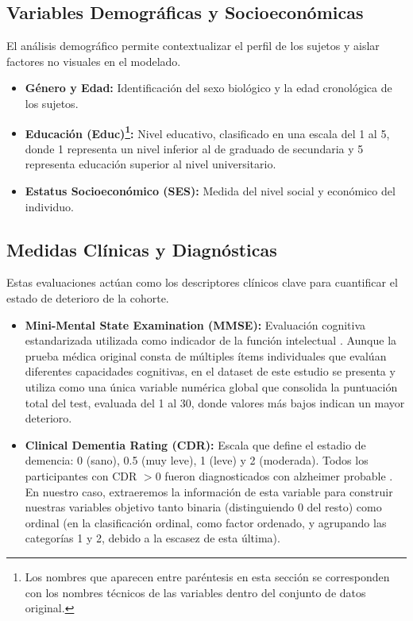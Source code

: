 \documentclass[12pt, oneside, english, spanish]{book}
\begin{document}
\subsection{Variables Demográficas y Socioeconómicas} \label{subsec:variables_demograficas}
El análisis demográfico permite contextualizar el perfil de los sujetos y aislar factores no visuales en el modelado.
\begin{itemize}
	\item \textbf{Género y Edad:} Identificación del sexo biológico y la edad cronológica de los sujetos.
	\item \textbf{Educación (Educ)\footnote{Los nombres que aparecen entre paréntesis en esta sección se corresponden con los nombres técnicos de las variables dentro del conjunto de datos original.}:} Nivel educativo, clasificado en una escala del 1 al 5, donde 1 representa un nivel inferior al de graduado de secundaria y 5 representa educación superior al nivel universitario.
	\item \textbf{Estatus Socioeconómico (SES):} Medida del nivel social y económico del individuo.
\end{itemize}

\subsection{Medidas Clínicas y Diagnósticas} \label{subsec:medidas_clinicas}
Estas evaluaciones actúan como los descriptores clínicos clave para cuantificar el estado de deterioro de la cohorte.
\begin{itemize}
	\item \textbf{Mini-Mental State Examination (MMSE):} Evaluación cognitiva estandarizada utilizada como indicador de la función intelectual \cite{folstein1975mini}. Aunque la prueba médica original consta de múltiples ítems individuales que evalúan diferentes capacidades cognitivas, en el dataset de este estudio se presenta y utiliza como una única variable numérica global que consolida la puntuación total del test, evaluada del 1 al 30, donde valores más bajos indican un mayor deterioro.
	
	\item \textbf{Clinical Dementia Rating (CDR):} Escala que define el estadio de demencia: 0 (sano), 0.5 (muy leve), 1 (leve) y 2 (moderada). Todos los participantes con CDR $> 0$ fueron diagnosticados con alzheimer probable \cite{morris1993clinical}. En nuestro caso, extraeremos la información de esta variable para construir nuestras variables objetivo tanto binaria (distinguiendo 0 del resto) como ordinal (en la clasificación ordinal, como factor ordenado, y agrupando las categorías 1 y 2, debido a la escasez de esta última).
\end{itemize}
\end{document}
